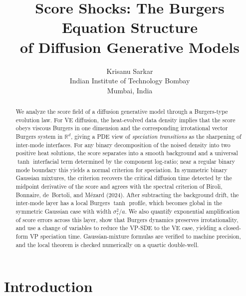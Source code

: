 \documentclass[11pt]{article}
\title{\textbf{Score Shocks: The Burgers Equation Structure\\of Diffusion Generative Models}}
\author{Krisanu Sarkar\\Indian Institute of Technology Bombay\\Mumbai, India}
\date{}
\newcommand{\R}{\mathbb{R}}
\begin{document}
\maketitle
\setcounter{tocdepth}{2}
\tableofcontents

\newpage

\begin{abstract}
We analyze the score field of a diffusion generative model through a Burgers-type evolution law. For VE diffusion, the heat-evolved data density implies that the score obeys viscous Burgers in one dimension and the corresponding irrotational vector Burgers system in $\R^d$, giving a PDE view of \emph{speciation transitions} as the sharpening of inter-mode interfaces. For any binary decomposition of the noised density into two positive heat solutions, the score separates into a smooth background and a universal $\tanh$ interfacial term determined by the component log-ratio; near a regular binary mode boundary this yields a normal criterion for speciation. In symmetric binary Gaussian mixtures, the criterion recovers the critical diffusion time detected by the midpoint derivative of the score and agrees with the spectral criterion of Biroli, Bonnaire, de~Bortoli, and M\'ezard (2024). After subtracting the background drift, the inter-mode layer has a local Burgers $\tanh$ profile, which becomes global in the symmetric Gaussian case with width $\sigma_\tau^2/a$. We also quantify exponential amplification of score errors across this layer, show that Burgers dynamics preserves irrotationality, and use a change of variables to reduce the VP-SDE to the VE case, yielding a closed-form VP speciation time. Gaussian-mixture formulas are verified to machine precision, and the local theorem is checked numerically on a quartic double-well.
\end{abstract}

\section{Introduction}\label{sec:intro}
\end{document}
